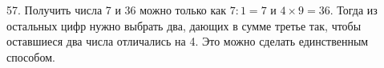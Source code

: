 57. Получить числа 7 и 36 можно только как $7:1=7$ и $4\times9=36.$ Тогда из остальных цифр нужно выбрать два, дающих в сумме третье так, чтобы оставшиеся два числа отличались на 4. Это можно сделать единственным способом.
\begin{center}
\begin{figure}[ht!]
\end{figure}
\end{center}
